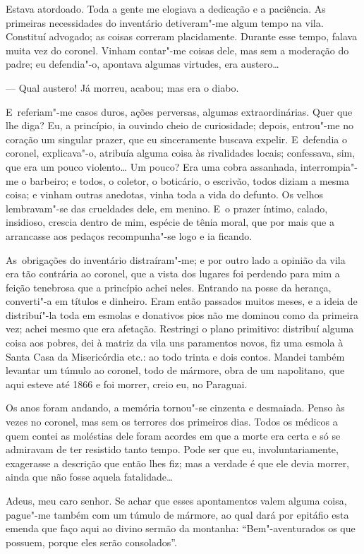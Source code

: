 \begin{linenumbers}
Estava atordoado. Toda a gente me elogiava a dedicação e a paciência. As
primeiras necessidades do inventário detiveram"-me algum tempo na vila.
Constituí advogado; as coisas correram placidamente. Durante esse tempo,
falava muita vez do coronel. Vinham contar"-me coisas dele, mas sem a
moderação do padre; eu defendia"-o, apontava algumas virtudes, era
austero\ldots{}

--- Qual austero! Já morreu, acabou; mas era o diabo.

E~referiam"-me casos duros, ações perversas, algumas extraordinárias.
Quer que lhe diga? Eu, a princípio, ia ouvindo cheio de curiosidade;
depois, entrou"-me no coração um singular prazer, que eu sinceramente
buscava expelir. E~defendia o coronel, explicava"-o, atribuía alguma
coisa às rivalidades locais; confessava, sim, que era um pouco
violento\ldots{} Um pouco? Era uma cobra assanhada, interrompia"-me o
barbeiro; e todos, o coletor, o boticário, o escrivão, todos diziam a
mesma coisa; e vinham outras anedotas, vinha toda a vida do defunto. Os
velhos lembravam"-se das crueldades dele, em menino. E~o prazer íntimo,
calado, insidioso, crescia dentro de mim, espécie de tênia moral, que
por mais que a arrancasse aos pedaços recompunha"-se logo e ia ficando.

As~obrigações do inventário distraíram"-me; e por outro lado a opinião da
vila era tão contrária ao coronel, que a vista dos lugares foi perdendo
para mim a feição tenebrosa que a princípio achei neles. Entrando na
posse da herança, converti"-a em títulos e dinheiro. Eram então passados
muitos meses, e a ideia de distribuí"-la toda em esmolas e donativos pios
não me dominou como da primeira vez; achei mesmo que era afetação.
Restringi o plano primitivo: distribuí alguma coisa aos pobres, dei à
matriz da vila uns paramentos novos, fiz uma esmola à Santa Casa da
Misericórdia etc.: ao todo trinta e dois contos. Mandei também levantar
um túmulo ao coronel, todo de mármore, obra de um napolitano, que aqui
esteve até 1866 e foi morrer, creio eu, no Paraguai.

Os anos foram andando, a memória tornou"-se cinzenta e desmaiada. Penso
às vezes no coronel, mas sem os terrores dos primeiros dias. Todos os
médicos a quem contei as moléstias dele foram acordes em que a morte era
certa e só se admiravam de ter resistido tanto tempo. Pode ser que eu,
involuntariamente, exagerasse a descrição que então lhes fiz; mas a
verdade é que ele devia morrer, ainda que não fosse aquela fatalidade\ldots{}

Adeus, meu caro senhor. Se achar que esses apontamentos valem alguma
coisa, pague"-me também com um túmulo de mármore, ao qual dará por
epitáfio esta emenda que faço aqui ao divino sermão da montanha:
``Bem"-aventurados os que possuem, porque eles serão consolados''.

\end{linenumbers}

